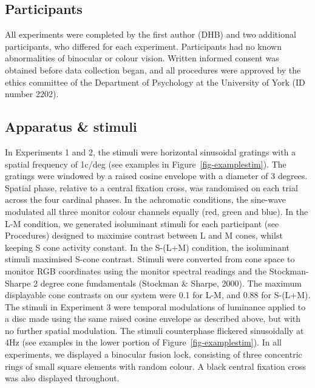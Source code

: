 \documentclass[
  letterpaper,
  DIV=11,
  numbers=noendperiod]{scrartcl}
\begin{document}
\hypertarget{participants}{%
\subsection{Participants}\label{participants}}

All experiments were completed by the first author (DHB) and two
additional participants, who differed for each experiment. Participants
had no known abnormalities of binocular or colour vision. Written
informed consent was obtained before data collection began, and all
procedures were approved by the ethics committee of the Department of
Psychology at the University of York (ID number 2202).

\hypertarget{apparatus-stimuli}{%
\subsection{Apparatus \& stimuli}\label{apparatus-stimuli}}

In Experiments 1 and 2, the stimuli were horizontal sinusoidal gratings
with a spatial frequency of 1c/deg (see examples in
Figure~\ref{fig-examplestim}). The gratings were windowed by a raised
cosine envelope with a diameter of 3 degrees. Spatial phase, relative to
a central fixation cross, was randomised on each trial across the four
cardinal phases. In the achromatic conditions, the sine-wave modulated
all three monitor colour channels equally (red, green and blue). In the
L-M condition, we generated isoluminant stimuli for each participant
(see Procedures) designed to maximise contrast between L and M cones,
whilst keeping S cone activity constant. In the S-(L+M) condition, the
isoluminant stimuli maximised S-cone contrast. Stimuli were converted
from cone space to monitor RGB coordinates using the monitor spectral
readings and the Stockman-Sharpe 2 degree cone fundamentals (Stockman \&
Sharpe, 2000). The maximum displayable cone contrasts on our system were
0.1 for L-M, and 0.88 for S-(L+M). The stimuli in Experiment 3 were
temporal modulations of luminance applied to a disc made using the same
raised cosine envelope as described above, but with no further spatial
modulation. The stimuli counterphase flickered sinusoidally at 4Hz (see
examples in the lower portion of Figure~\ref{fig-examplestim}). In all
experiments, we displayed a binocular fusion lock, consisting of three
concentric rings of small square elements with random colour. A black
central fixation cross was also displayed throughout.
\end{document}
